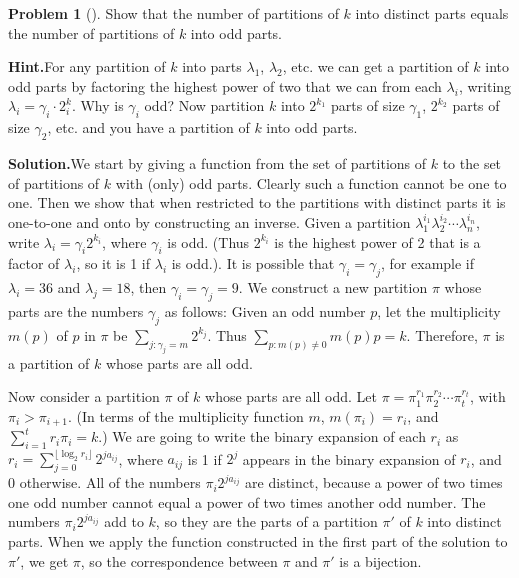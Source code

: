 \documentclass[10pt,]{book}
\theoremstyle{plain}
\theoremstyle{definition}
\newtheorem{activity}[project]{Problem}
\theoremstyle{definition}
\numberwithin{equation}{chapter}
\begin{document}
\begin{activity}[]\label{activity-176}
Show that the number of partitions of \(k\) into distinct parts equals the number of partitions of \(k\) into odd parts.%
\par\medskip\noindent%
\textbf{Hint.}\quad For any partition of \(k\) into parts \(\lambda_1\), \(\lambda_2\), etc. we can get a partition of \(k\) into odd parts by factoring the highest power of two that we can from each \(\lambda_i\), writing \(\lambda_i = \gamma_i\cdot 2^k_i\).  Why is \(\gamma_i\) odd? Now partition \(k\) into \(2^{k_1}\) parts of size \(\gamma_1\), \(2^{k_2}\) parts of size \(\gamma_2\), etc. and you have a partition of \(k\) into odd parts.%
\par\medskip\noindent%
\textbf{Solution.}\quad We start by giving a function from the set of partitions of \(k\) to the set of partitions of \(k\) with (only) odd parts. Clearly such a function cannot be one to one. Then we show that when restricted to the partitions with distinct parts it is one-to-one and onto by constructing an inverse. Given a partition \(\lambda_1^{i_1}\lambda_2^{i_2}\cdots\lambda_n^{i_n}\), write \(\lambda_i=\gamma_i2^{k_i}\), where \(\gamma_i\) is odd. (Thus \(2^{k_i}\) is the highest power of 2 that is a factor of \(\lambda_i\), so it is 1 if \(\lambda_i\) is odd.). It is possible that \(\gamma_i=\gamma_j\), for example if \(\lambda_i=36\) and \(\lambda_j=18\), then \(\gamma_i=\gamma_j=9\). We construct a new partition \(\pi\) whose parts are the numbers \(\gamma_j\) as follows: Given an odd number \(p\), let the multiplicity \(m(p)\) of \(p\) in \(\pi\) be \(\sum_{j: \gamma_j=m} 2^{k_j}\). Thus \(\sum_{p: m(p)\not=0}m(p)p = k\). Therefore, \(\pi\) is a partition of \(k\) whose parts are all odd.%
\par
Now consider a partition \(\pi\) of \(k\) whose parts are all odd. Let \(\pi=\pi_1^{r_1}\pi_2^{r_2}\cdots \pi_t^{r_t}\), with \(\pi_i>\pi_{i+1}\). (In terms of the multiplicity function \(m\), \(m(\pi_i) =r_i\), and \(\sum_{i=1}^t r_i\pi_i = k\).) We are going to write the binary expansion of each \(r_i\) as \(r_i = \sum_{j= 0}^{\lfloor \log_2 r_i\rfloor} 2^{ja_{ij}}\), where \(a_{ij}\) is 1 if \(2^j\) appears in the binary expansion of \(r_i\), and 0 otherwise. All of the numbers \(\pi_i2^{ja_{ij}}\) are distinct, because a power of two times one odd number cannot equal a power of two times another odd number. The numbers \(\pi_i2^{ja_{ij}}\) add to \(k\), so they are the parts of a partition \(\pi'\) of \(k\) into distinct parts. When we apply the function constructed in the first part of the solution to \(\pi'\), we get \(\pi\), so the correspondence between \(\pi\) and \(\pi'\) is a bijection.%
\end{activity}
\end{document}
